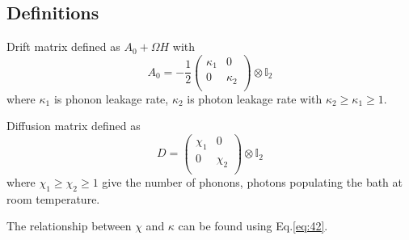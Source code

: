 \documentclass[11pt,a4paper]{article}
\numberwithin{equation}{section}
\begin{document}
	\subsection{Definitions}
	\label{sec:optodefs}	
	Drift matrix defined as $A_0 +\Omega H$ with
	\begin{equation*}
	A_0 = -\frac{1}{2} \begin{pmatrix}
	\kappa_1 & 0\\
	0 & \kappa_{2}\\
	\end{pmatrix} \otimes \mathbb{I}_2
	\end{equation*} where $\kappa_1$ is phonon leakage rate, $\kappa_{2}$ is photon leakage rate with $\kappa_{2} \geq \kappa_{1} \geq 1$.
	
	Diffusion matrix defined as
	\begin{equation*}
	D = \begin{pmatrix}
	\chi_1 & 0\\
	0 & \chi_2\\
	\end{pmatrix} \otimes \mathbb{I}_2
	\end{equation*} where $\chi_1 \geq \chi_2 \geq 1$ give the number of phonons, photons populating the bath at room temperature.
	
	The relationship between $\chi$ and $\kappa$ can be found using Eq.\ref{eq:42}.
\end{document}
